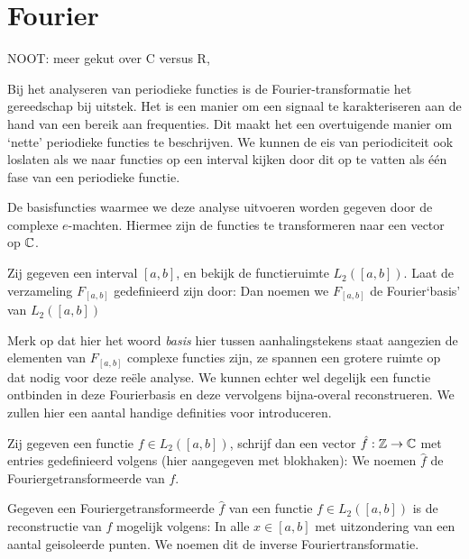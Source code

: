 \chapter{Fourier}

NOOT: meer gekut over C versus R, 

Bij het analyseren van periodieke functies is de Fourier-transformatie het gereedschap bij uitstek.
Het is een manier om een signaal te karakteriseren aan de hand van een bereik aan frequenties.
Dit maakt het een overtuigende manier om `nette' periodieke functies te beschrijven.
We kunnen de eis van periodiciteit ook loslaten als we naar functies op een interval kijken door dit op te vatten
als \'e\'en fase van een periodieke functie.

De basisfuncties waarmee we deze analyse uitvoeren worden gegeven door de complexe $e$-machten.
Hiermee zijn de functies te transformeren naar een vector op $\mathbb{C}$.
\begin{definitie}[FourierBasis] Zij gegeven een interval $[a,b]$, en bekijk de functieruimte $L_2([a,b])$. 
Laat de verzameling $F_{[a,b]}$ gedefinieerd zijn door:
Dan noemen we $F_{[a,b]}$ de Fourier`basis' van $L_2([a,b])$
\end{definitie}
Merk op dat hier het woord \emph{basis} hier tussen aanhalingstekens staat aangezien de elementen van $F_{[a,b]}$ 
complexe functies zijn, ze spannen een grotere ruimte op dat nodig voor deze re\"ele analyse.
We kunnen echter wel degelijk een functie ontbinden in deze Fourierbasis en deze vervolgens bijna-overal reconstrueren.
We zullen hier een aantal handige definities voor introduceren.

\begin{definitie}[Fouriergetransformeerde]
Zij gegeven een functie $f\in L_2({[a,b]})$, schrijf dan een vector $\hat f : \mathbb{Z}\to\mathbb{C}$ met entries gedefinieerd volgens (hier aangegeven met blokhaken):
We noemen $\hat f$ de Fouriergetransformeerde van $f$.
\end{definitie}
\begin{definitie}
  Gegeven een Fouriergetransformeerde $\hat f$ van een functie $f \in L_2([a,b])$ is de reconstructie van $f$ mogelijk volgens:
  In alle $x \in [a,b]$ met uitzondering van een aantal geisoleerde punten. We noemen dit de inverse Fouriertransformatie.
\end{definitie}

